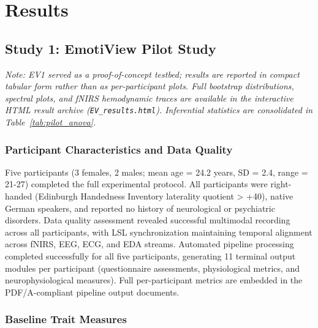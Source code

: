\section{Results}

\subsection{Study 1: EmotiView Pilot Study}
\label{sec:results_ev1}

\noindent\textit{Note: EV1 served as a proof-of-concept testbed; results are reported in compact tabular form rather than as per-participant plots. Full bootstrap distributions, spectral plots, and fNIRS hemodynamic traces are available in the interactive HTML result archive (\texttt{EV\_results.html}). Inferential statistics are consolidated in Table~\ref{tab:pilot_anova}.}

\subsubsection{Participant Characteristics and Data Quality}

Five participants (3 females, 2 males; mean age = 24.2 years, SD = 2.4, range = 21-27) completed the full experimental protocol. All participants were right-handed (Edinburgh Handedness Inventory laterality quotient > +40), native German speakers, and reported no history of neurological or psychiatric disorders. Data quality assessment revealed successful multimodal recording across all participants, with \gls{LSL} synchronization maintaining temporal alignment across \gls{fNIRS}, \gls{EEG}, \gls{ECG}, and \gls{EDA} streams. Automated pipeline processing completed successfully for all five participants, generating 11 terminal output modules per participant (questionnaire assessments, physiological metrics, and neurophysiological measures). Full per-participant metrics are embedded in the PDF/A-compliant pipeline output documents.

\subsubsection{Baseline Trait Measures}

